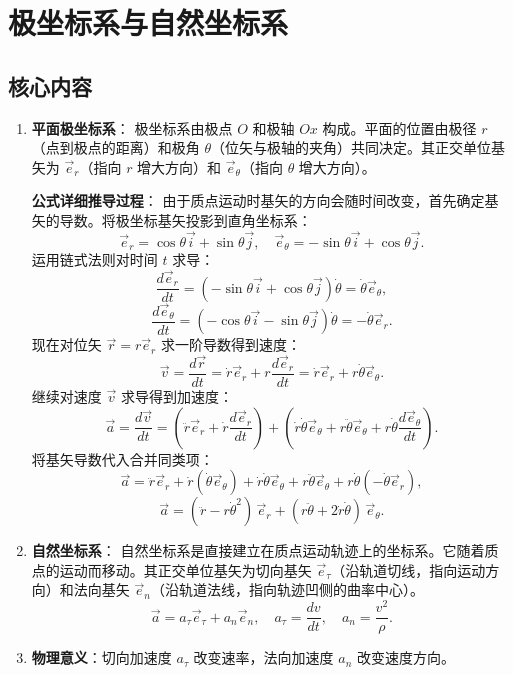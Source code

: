 \documentclass[UTF8]{ctexart}
\begin{document}
	\section{极坐标系与自然坐标系}
	\subsection*{核心内容}
	\begin{enumerate}
		\item \textbf{平面极坐标系}：
		极坐标系由极点 $O$ 和极轴 $Ox$ 构成。平面的位置由极径 $r$（点到极点的距离）和极角 $\theta$（位矢与极轴的夹角）共同决定。其正交单位基矢为 $\vec{e}_r$（指向 $r$ 增大方向）和 $\vec{e}_\theta$（指向 $\theta$ 增大方向）。
		
		\textbf{公式详细推导过程}：
		由于质点运动时基矢的方向会随时间改变，首先确定基矢的导数。将极坐标基矢投影到直角坐标系：
		\[
		\vec{e}_r = \cos\theta\vec{i} + \sin\theta\vec{j},\quad \vec{e}_\theta = -\sin\theta\vec{i} + \cos\theta\vec{j}.
		\]
		运用链式法则对时间 $t$ 求导：
		\[
		\frac{d\vec{e}_r}{dt} = (-\sin\theta\vec{i} + \cos\theta\vec{j})\dot{\theta} = \dot{\theta}\vec{e}_\theta,
		\]
		\[
		\frac{d\vec{e}_\theta}{dt} = (-\cos\theta\vec{i} - \sin\theta\vec{j})\dot{\theta} = -\dot{\theta}\vec{e}_r.
		\]
		现在对位矢 $\vec{r} = r\vec{e}_r$ 求一阶导数得到速度：
		\[
		\vec{v} = \frac{d\vec{r}}{dt} = \dot{r}\vec{e}_r + r\frac{d\vec{e}_r}{dt} = \dot{r}\vec{e}_r + r\dot{\theta}\vec{e}_\theta.
		\]
		继续对速度 $\vec{v}$ 求导得到加速度：
		\[
		\vec{a} = \frac{d\vec{v}}{dt} = (\ddot{r}\vec{e}_r + \dot{r}\frac{d\vec{e}_r}{dt}) + (\dot{r}\dot{\theta}\vec{e}_\theta + r\ddot{\theta}\vec{e}_\theta + r\dot{\theta}\frac{d\vec{e}_\theta}{dt}).
		\]
		将基矢导数代入合并同类项：
		\[
		\vec{a} = \ddot{r}\vec{e}_r + \dot{r}(\dot{\theta}\vec{e}_\theta) + \dot{r}\dot{\theta}\vec{e}_\theta + r\ddot{\theta}\vec{e}_\theta + r\dot{\theta}(-\dot{\theta}\vec{e}_r),
		\]
		\[
		\vec{a} = (\ddot{r} - r\dot{\theta}^2)\,\vec{e}_r + (r\ddot{\theta} + 2\dot{r}\dot{\theta})\,\vec{e}_\theta.
		\]
		
		\item \textbf{自然坐标系}：
		自然坐标系是直接建立在质点运动轨迹上的坐标系。它随着质点的运动而移动。其正交单位基矢为切向基矢 $\vec{e}_\tau$（沿轨道切线，指向运动方向）和法向基矢 $\vec{e}_n$（沿轨道法线，指向轨迹凹侧的曲率中心）。
		\[
		\vec{a} = a_\tau \vec{e}_\tau + a_n \vec{e}_n,\quad a_\tau = \frac{dv}{dt},\quad a_n = \frac{v^2}{\rho}.
		\]
		
		\item \textbf{物理意义}：切向加速度 $a_\tau$ 改变速率，法向加速度 $a_n$ 改变速度方向。
	\end{enumerate}
	
\end{document}
